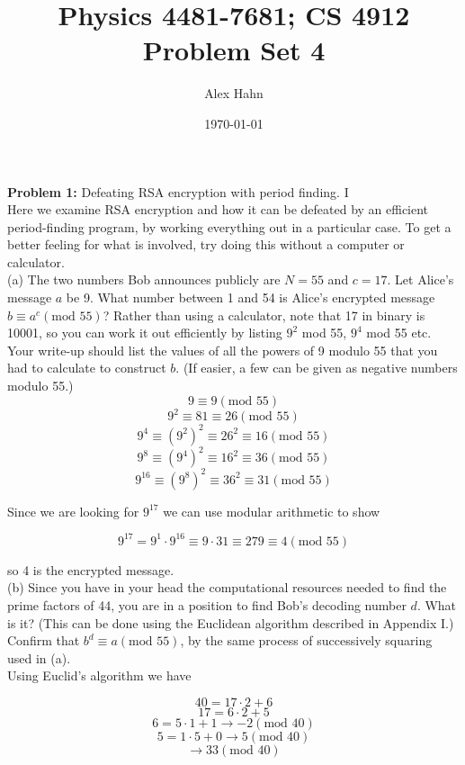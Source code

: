 
\setlength{\parindent}{0pt}

\title{Physics 4481-7681; CS 4912 Problem Set 4}
\author{Alex Hahn}
\date{\today}
\maketitle

\textbf{Problem 1:} Defeating RSA encryption with period finding. I\\
Here we examine RSA encryption and how it can be defeated by an efficient
period-finding program, by working everything out in a particular case. To get
a better feeling for what is involved, try doing this without a computer or
calculator.\\

(a) The two numbers Bob announces publicly are $N=55$ and $c=17$. Let
Alice's message $a$ be 9. What number between 1 and 54 is Alice's encrypted
message $b\equiv a^c(\text{mod }55)$? Rather than using a calculator, note that 17 in
binary is 10001, so you can work it out efficiently by listing $9^2$ mod 55,
$9^4$ mod 55 etc. Your write-up should list the values of all the powers of 9
modulo 55 that you had to calculate to construct $b$. (If easier, a few can be
given as negative numbers modulo 55.)\\

$$9\equiv9(\text{mod }55)$$
$$9^2\equiv81\equiv26(\text{mod }55)$$
$$9^4\equiv(9^2)^2\equiv26^2\equiv16(\text{mod }55)$$
$$9^8\equiv(9^4)^2\equiv16^2\equiv36(\text{mod }55)$$
$$9^{16}\equiv(9^8)^2\equiv36^2\equiv31(\text{mod }55)$$

Since we are looking for $9^{17}$ we can use modular arithmetic to show

$$9^{17}=9^1\cdot9^{16}\equiv9\cdot31\equiv279\equiv4(\text{mod }55)$$

so 4 is the encrypted message.\\

(b) Since you have in your head the computational resources needed to find the
prime factors of 44, you are in a position to find Bob's decoding number
$d$. What is it? (This can be done using the Euclidean algorithm described in
Appendix I.) Confirm that $b^d\equiv a(\text{mod }55)$, by the same process of
successively squaring used in (a).\\

Using Euclid's algorithm we have

$$40=17\cdot2+6$$
$$17=6\cdot2+5$$
$$6=5\cdot1+1 \rightarrow -2(\text{mod }40)$$
$$5=1\cdot5+0\rightarrow 5(\text{mod }40)$$
$$\rightarrow33(\text{mod }40)$$

